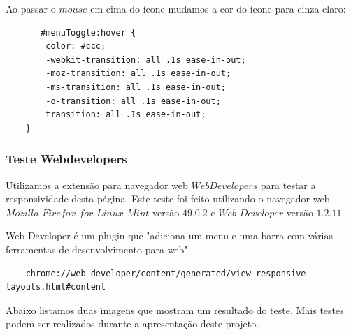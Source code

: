 	Ao passar o $mouse$ em cima do ícone mudamos a cor do ícone para cinza claro:
	
	
		\begin{lstlisting}
	   #menuToggle:hover {
        color: #ccc;
        -webkit-transition: all .1s ease-in-out;
        -moz-transition: all .1s ease-in-out;
        -ms-transition: all .1s ease-in-out;
        -o-transition: all .1s ease-in-out;
        transition: all .1s ease-in-out;
    }
\end{lstlisting}
\subsubsection{Teste Webdevelopers}	  

    Utilizamos a extensão para navegador web $Web Developers$ para testar a responsividade desta página. Este teste foi feito utilizando o navegador web $Mozilla$ $Firefox$ $for$ $Linux$ $Mint$ versão $49.0.2$ e $Web$ $Developer$ versão $1.2.11$.
    
    Web Developer é um plugin que "adiciona um menu e uma barra com várias ferramentas de desenvolvimento para web"
    
    
\begin{lstlisting}
    chrome://web-developer/content/generated/view-responsive-layouts.html#content
\end{lstlisting}

	Abaixo listamos duas imagens que mostram um resultado do teste. Mais testes podem ser realizados durante a apresentação deste projeto.

